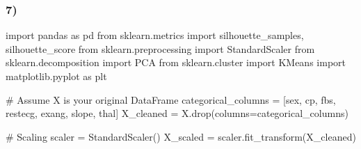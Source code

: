 \documentclass[
  11pt,
  letterpaper,
  DIV=11,
  numbers=noendperiod]{scrartcl}
\newenvironment{Shaded}{\begin{snugshade}}{\end{snugshade}}
\newcommand{\CommentTok}[1]{\textcolor[rgb]{0.37,0.37,0.37}{#1}}
\newcommand{\ImportTok}[1]{\textcolor[rgb]{0.00,0.46,0.62}{#1}}
\newcommand{\NormalTok}[1]{\textcolor[rgb]{0.00,0.23,0.31}{#1}}
\newcommand{\OperatorTok}[1]{\textcolor[rgb]{0.37,0.37,0.37}{#1}}
\newcommand{\StringTok}[1]{\textcolor[rgb]{0.13,0.47,0.30}{#1}}
\begin{document}
\subsubsection{7)}\label{section-6}

\begin{Shaded}
\begin{Highlighting}[]
\ImportTok{import}\NormalTok{ pandas }\ImportTok{as}\NormalTok{ pd}
\ImportTok{from}\NormalTok{ sklearn.metrics }\ImportTok{import}\NormalTok{ silhouette\_samples, silhouette\_score}
\ImportTok{from}\NormalTok{ sklearn.preprocessing }\ImportTok{import}\NormalTok{ StandardScaler}
\ImportTok{from}\NormalTok{ sklearn.decomposition }\ImportTok{import}\NormalTok{ PCA}
\ImportTok{from}\NormalTok{ sklearn.cluster }\ImportTok{import}\NormalTok{ KMeans}
\ImportTok{import}\NormalTok{ matplotlib.pyplot }\ImportTok{as}\NormalTok{ plt}

\CommentTok{\# Assume X is your original DataFrame}
\NormalTok{categorical\_columns }\OperatorTok{=}\NormalTok{ [}\StringTok{\textquotesingle{}sex\textquotesingle{}}\NormalTok{, }\StringTok{\textquotesingle{}cp\textquotesingle{}}\NormalTok{, }\StringTok{\textquotesingle{}fbs\textquotesingle{}}\NormalTok{, }\StringTok{\textquotesingle{}restecg\textquotesingle{}}\NormalTok{, }\StringTok{\textquotesingle{}exang\textquotesingle{}}\NormalTok{, }\StringTok{\textquotesingle{}slope\textquotesingle{}}\NormalTok{, }\StringTok{\textquotesingle{}thal\textquotesingle{}}\NormalTok{]}
\NormalTok{X\_cleaned }\OperatorTok{=}\NormalTok{ X.drop(columns}\OperatorTok{=}\NormalTok{categorical\_columns)}

\CommentTok{\# Scaling}
\NormalTok{scaler }\OperatorTok{=}\NormalTok{ StandardScaler()}
\NormalTok{X\_scaled }\OperatorTok{=}\NormalTok{ scaler.fit\_transform(X\_cleaned)}
\end{Highlighting}
\end{Shaded}
\end{document}
